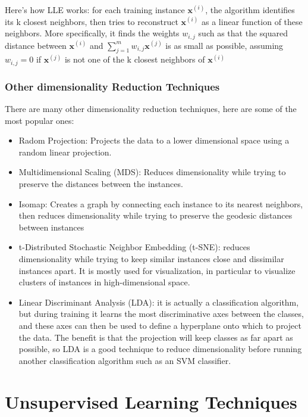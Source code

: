 \documentclass[french]{article}
\begin{document}
Here's how LLE works: for each training instance $\bm{x}^{(i)}$, the algorithm identifies its k closest neighbors, then tries to reconstruct $\bm{x}^{(i)}$ as a linear function of these neighbors. More specifically, it finds the weights $w_{i,j}$ such as that the squared distance between $\bm{x}^{(i)}$ and $\sum_{j=1}^m w_{i,j} \bm{x}^{(j)}$ is as small as possible, assuming $w_{i,j} = 0$ if $\bm{x}^{(j)}$ is not one of the k closest neighbors of $\bm{x}^{(i)}$

\subsubsection{Other dimensionality Reduction Techniques}

There are many other dimensionality reduction techniques, here are some of the most popular ones:
\begin{itemize}
    \item Radom Projection: Projects the data to a lower dimensional space using a random linear projection.
    \item Multidimensional Scaling (MDS): Reduces dimensionality while trying to preserve the distances between the instances.
    \item Isomap: Creates a graph by connecting each instance to its nearest neighbors, then reduces dimensionality while trying to preserve the geodesic distances between instances
    \item t-Distributed Stochastic Neighbor Embedding (t-SNE): reduces dimensionality while trying to keep similar instances close and dissimilar instances apart. It is mostly used for visualization, in particular to visualize clusters of instances in high-dimensional space.
    \item Linear Discriminant Analysis (LDA): it is actually a classification algorithm, but during training it learns the most discriminative axes between the classes, and these axes can then be used to define a hyperplane onto which to project the data. The benefit is that the projection will keep classes as far apart as possible, so LDA is a good technique to reduce dimensionality before running another classification algorithm such as an SVM classifier.
\end{itemize}

\section{Unsupervised Learning Techniques}
\end{document}
